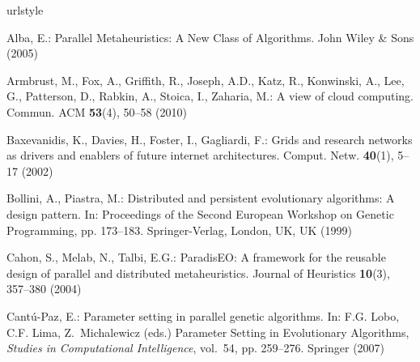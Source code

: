 
% 



%
%
%
\begin{thebibliography}{10}
\providecommand{\url}[1]{{#1}}
\providecommand{\urlprefix}{URL }
\expandafter\ifx\csname urlstyle\endcsname\relax
  \providecommand{\doi}[1]{DOI~\discretionary{}{}{}#1}\else
  \providecommand{\doi}{DOI~\discretionary{}{}{}\begingroup
  \urlstyle{rm}\Url}\fi

Alba, E.: Parallel Metaheuristics: {A} New Class of Algorithms.
\newblock John Wiley \& Sons (2005)

Armbrust, M., Fox, A., Griffith, R., Joseph, A.D., Katz, R., Konwinski, A.,
  Lee, G., Patterson, D., Rabkin, A., Stoica, I., Zaharia, M.: A view of cloud
  computing.
\newblock Commun. ACM \textbf{53}(4), 50--58 (2010)

Baxevanidis, K., Davies, H., Foster, I., Gagliardi, F.: Grids and research
  networks as drivers and enablers of future internet architectures.
\newblock Comput. Netw. \textbf{40}(1), 5--17 (2002)

Bollini, A., Piastra, M.: Distributed and persistent evolutionary algorithms: A
  design pattern.
\newblock In: Proceedings of the Second European Workshop on Genetic
  Programming, pp. 173--183. Springer-Verlag, London, UK, UK (1999)

Cahon, S., Melab, N., Talbi, E.G.: {ParadisEO}: A framework for the reusable
  design of parallel and distributed metaheuristics.
\newblock Journal of Heuristics \textbf{10}(3), 357--380 (2004)

Cant\'u-Paz, E.: Parameter setting in parallel genetic algorithms.
\newblock In: F.G. Lobo, C.F. Lima, Z.~Michalewicz (eds.) Parameter Setting in
  Evolutionary Algorithms, \emph{Studies in Computational Intelligence},
  vol.~54, pp. 259--276. Springer (2007)


\end{thebibliography}
